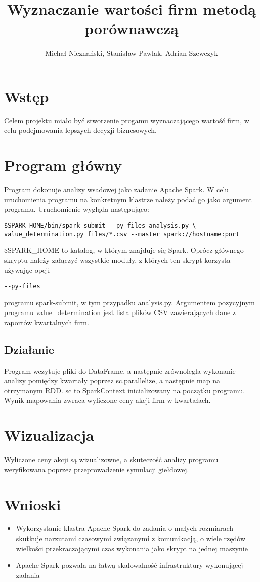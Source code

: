 \documentclass{article}
\begin{document}
\title{Wyznaczanie wartości firm metodą porównawczą}
\author{Michał Nieznański, Stanisław Pawlak, Adrian Szewczyk}
\maketitle

\section{Wstęp}
Celem projektu miało być stworzenie progamu wyznaczającego wartość firm, w celu podejmowania
lepszych decyzji biznesowych.
\section{Program główny}
Program dokonuje analizy wsadowej jako zadanie Apache Spark.
W celu uruchomienia programu na konkretnym klastrze należy podać go jako argument programu.
Uruchomienie wygląda następująco:
\begin{verbatim}
$SPARK_HOME/bin/spark-submit --py-files analysis.py \
value_determination.py files/*.csv --master spark://hostname:port
\end{verbatim}
\$SPARK\_HOME to katalog, w którym znajduje się Spark.
Oprócz głównego skryptu należy załączyć wszystkie moduły, z których ten skrypt korzysta używając
opcji
\begin{verbatim}
--py-files
\end{verbatim}
programu spark-submit, w tym przypadku analysis.py.
Argumentem pozycyjnym programu value\_determination jest lista plików CSV zawierających dane z raportów
kwartalnych firm.
\subsection{Działanie}
Program wczytuje pliki do DataFrame, a następnie zrównolegla wykonanie analizy pomiędzy kwartały
poprzez sc.parallelize, a następnie map na otrzymanym RDD.
sc to SparkContext inicializowany na początku programu.
Wynik mapowania zwraca wyliczone ceny akcji firm w kwartałach.
\section{Wizualizacja}
Wyliczone ceny akcji są wizualizowne, a skuteczość analizy programu weryfikowana poprzez
przeprowadzenie symulacji giełdowej.
\section{Wnioski}
\begin{itemize}
	\item Wykorzystanie klastra Apache Spark do zadania o
		małych rozmiarach skutkuje narzutami czasowymi związanymi z komunikacją,
		o wiele rzędów wielkości przekraczającymi czas wykonania jako skrypt na jednej maszynie
	\item Apache Spark pozwala na łatwą skalowalność infrastruktury wykonującej zadania
\end{itemize}
\end{document}
